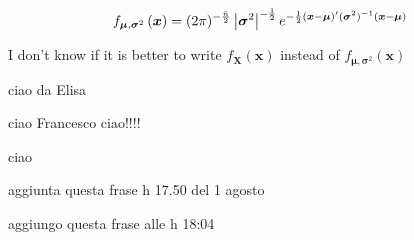 \documentclass{article}
\begin{document}
\begin{equation*}
f_{\boldsymbol{\mu },\boldsymbol{\sigma }^{2}}\left( \boldsymbol{x}\right)
=(2\pi )^{-\frac{\bar{n}}{2}}\left\vert \boldsymbol{\sigma }^{2}\right\vert
^{-\frac{1}{2}}e^{-\frac{1}{2}\left( \boldsymbol{x}-\boldsymbol{\mu }\right)
^{\prime }(\boldsymbol{\sigma }^{2})^{-1}\left( \boldsymbol{x}-\boldsymbol{%
\mu }\right) }
\end{equation*}

I don't know if it is better to write $f_{\boldsymbol{X}}\left( \boldsymbol{x%
}\right) $ instead of $f_{\boldsymbol{\mu },\boldsymbol{\sigma }^{2}}\left( 
\boldsymbol{x}\right) $

\bigskip

ciao da Elisa

\bigskip

ciao Francesco ciao!!!!

\bigskip

ciao

aggiunta questa frase h 17.50 del 1 agosto

\bigskip

aggiungo questa frase alle h 18:04 
\end{document}
